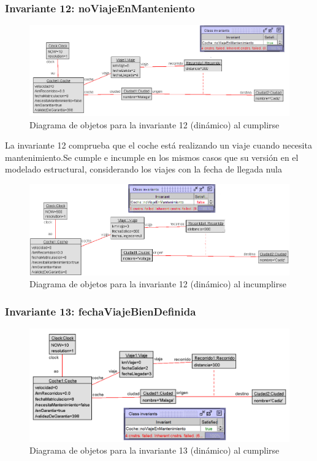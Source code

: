 \documentclass[12pt.a4paper]{article}
\begin{document}
\subsubsection{Invariante 12: noViajeEnManteniento}
\vspace{1.0 cm}
\begin{figure}[H]
     \includegraphics[width=0.80\linewidth]{Soils/dinamico_inv12_true.png}
     \caption{Diagrama de objetos para la invariante 12 (dinámico) al cumplirse}
\end{figure}
La invariante 12 comprueba que el coche está realizando un viaje cuando necesita mantenimiento.Se cumple e incumple en los mismos casos que su versión en el modelado estructural, considerando los viajes con la fecha de llegada nula

\begin{figure}[H]
     \includegraphics[width=1\linewidth]{Soils/dinamico_inv12_false.png}
     \caption{Diagrama de objetos para la invariante 12 (dinámico) al incumplirse}
\end{figure}

\subsubsection{Invariante 13: fechaViajeBienDefinida}
\vspace{1.0 cm}
\begin{figure}[H]
     \includegraphics[width=0.80\linewidth]{Soils/dinamico_inv13_true.png}
     \caption{Diagrama de objetos para la invariante 13 (dinámico) al cumplirse}
\end{figure}
\end{document}
